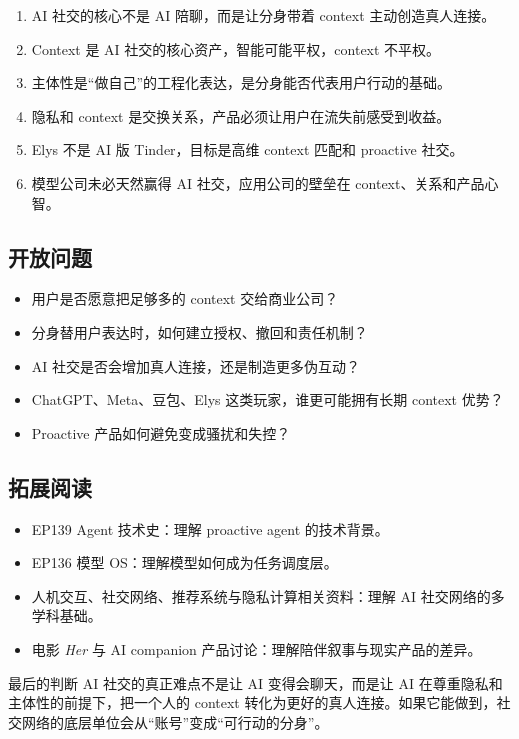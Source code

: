\documentclass[a4paper]{article}
\begin{document}
\begin{enumerate}
\item AI 社交的核心不是 AI 陪聊，而是让分身带着 context 主动创造真人连接。
\item Context 是 AI 社交的核心资产，智能可能平权，context 不平权。
\item 主体性是“做自己”的工程化表达，是分身能否代表用户行动的基础。
\item 隐私和 context 是交换关系，产品必须让用户在流失前感受到收益。
\item Elys 不是 AI 版 Tinder，目标是高维 context 匹配和 proactive 社交。
\item 模型公司未必天然赢得 AI 社交，应用公司的壁垒在 context、关系和产品心智。
\end{enumerate}

\subsection{开放问题}

\begin{itemize}
\item 用户是否愿意把足够多的 context 交给商业公司？
\item 分身替用户表达时，如何建立授权、撤回和责任机制？
\item AI 社交是否会增加真人连接，还是制造更多伪互动？
\item ChatGPT、Meta、豆包、Elys 这类玩家，谁更可能拥有长期 context 优势？
\item Proactive 产品如何避免变成骚扰和失控？
\end{itemize}

\subsection{拓展阅读}

\begin{itemize}
\item EP139 Agent 技术史：理解 proactive agent 的技术背景。
\item EP136 模型 OS：理解模型如何成为任务调度层。
\item 人机交互、社交网络、推荐系统与隐私计算相关资料：理解 AI 社交网络的多学科基础。
\item 电影 \textit{Her} 与 AI companion 产品讨论：理解陪伴叙事与现实产品的差异。
\end{itemize}

\begin{importantbox}{最后的判断}
AI 社交的真正难点不是让 AI 变得会聊天，而是让 AI 在尊重隐私和主体性的前提下，把一个人的 context 转化为更好的真人连接。如果它能做到，社交网络的底层单位会从“账号”变成“可行动的分身”。\end{importantbox}
\end{document}
